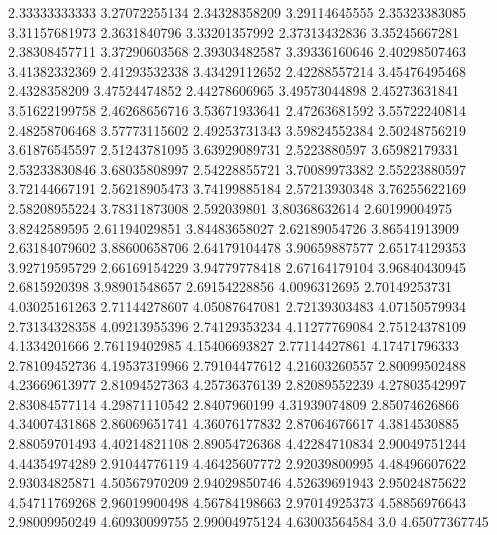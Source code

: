   2.33333333333    3.27072255134
  2.34328358209    3.29114645555
  2.35323383085    3.31157681973
   2.3631840796    3.33201357992
  2.37313432836    3.35245667281
  2.38308457711    3.37290603568
  2.39303482587    3.39336160646
  2.40298507463    3.41382332369
  2.41293532338    3.43429112652
  2.42288557214    3.45476495468
   2.4328358209    3.47524474852
  2.44278606965    3.49573044898
  2.45273631841    3.51622199758
  2.46268656716    3.53671933641
  2.47263681592    3.55722240814
  2.48258706468    3.57773115602
  2.49253731343    3.59824552384
  2.50248756219    3.61876545597
  2.51243781095    3.63929089731
   2.5223880597    3.65982179331
  2.53233830846    3.68035808997
  2.54228855721    3.70089973382
  2.55223880597    3.72144667191
  2.56218905473    3.74199885184
  2.57213930348    3.76255622169
  2.58208955224    3.78311873008
    2.592039801    3.80368632614
  2.60199004975     3.8242589595
  2.61194029851    3.84483658027
  2.62189054726    3.86541913909
  2.63184079602    3.88600658706
  2.64179104478    3.90659887577
  2.65174129353    3.92719595729
  2.66169154229    3.94779778418
  2.67164179104    3.96840430945
   2.6815920398    3.98901548657
  2.69154228856     4.0096312695
  2.70149253731    4.03025161263
  2.71144278607    4.05087647081
  2.72139303483    4.07150579934
  2.73134328358    4.09213955396
  2.74129353234    4.11277769084
  2.75124378109     4.1334201666
  2.76119402985    4.15406693827
  2.77114427861    4.17471796333
  2.78109452736    4.19537319966
  2.79104477612    4.21603260557
  2.80099502488    4.23669613977
  2.81094527363    4.25736376139
  2.82089552239    4.27803542997
  2.83084577114    4.29871110542
   2.8407960199    4.31939074809
  2.85074626866    4.34007431868
  2.86069651741    4.36076177832
  2.87064676617     4.3814530885
  2.88059701493    4.40214821108
  2.89054726368    4.42284710834
  2.90049751244    4.44354974289
  2.91044776119    4.46425607772
  2.92039800995    4.48496607622
  2.93034825871    4.50567970209
  2.94029850746    4.52639691943
  2.95024875622    4.54711769268
  2.96019900498    4.56784198663
  2.97014925373    4.58856976643
  2.98009950249    4.60930099755
  2.99004975124    4.63003564584
            3.0    4.65077367745
